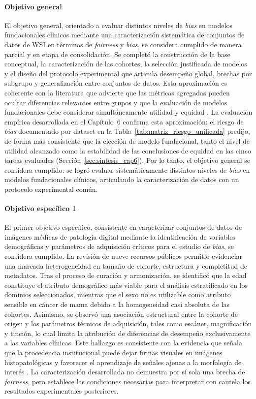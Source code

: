\paragraph{Objetivo general} El objetivo general, orientado a evaluar distintos niveles de \textit{bias} en modelos fundacionales clínicos mediante una caracterización sistemática de conjuntos de datos de WSI en términos de \textit{fairness} y \textit{bias}, se considera cumplido de manera parcial y en etapa de consolidación. Se completó la construcción de la base conceptual, la caracterización de las cohortes, la selección justificada de modelos y el diseño del protocolo experimental que articula desempeño global, brechas por subgrupo y generalización entre conjuntos de datos. Esta aproximación es coherente con la literatura que advierte que las métricas agregadas pueden ocultar diferencias relevantes entre grupos y que la evaluación de modelos fundacionales debe considerar simultáneamente utilidad y equidad \parencite{NEURIPS2024_c9826b9e}. La evaluación empírica desarrollada en el Capítulo~6 confirma esta aproximación: el riesgo de \textit{bias} documentado por dataset en la Tabla~\ref{tab:matriz_riesgo_unificada} predijo, de forma más consistente que la elección de modelo fundacional, tanto el nivel de utilidad alcanzado como la estabilidad de las conclusiones de equidad en las cinco tareas evaluadas (Sección~\ref{sec:sintesis_cap6}). Por lo tanto, el objetivo general se considera cumplido: se logró evaluar sistemáticamente distintos niveles de \textit{bias} en modelos fundacionales clínicos, articulando la caracterización de datos con un protocolo experimental común.

\paragraph{Objetivo específico 1} El primer objetivo específico, consistente en caracterizar conjuntos de datos de imágenes médicas de patología digital mediante la identificación de variables demográficas y parámetros de adquisición críticos para el estudio de \textit{bias}, se considera cumplido. La revisión de nueve recursos públicos permitió evidenciar una marcada heterogeneidad en tamaño de cohorte, estructura y completitud de metadatos. Tras el proceso de curación y armonización, se identificó que la edad constituye el atributo demográfico más viable para el análisis estratificado en los dominios seleccionados, mientras que el sexo no es utilizable como atributo sensible en cáncer de mama debido a la homogeneidad casi absoluta de las cohortes. Asimismo, se observó una asociación estructural entre la cohorte de origen y los parámetros técnicos de adquisición, tales como escáner, magnificación y tinción, lo cual limita la atribución de diferencias de desempeño exclusivamente a las variables clínicas. Este hallazgo es consistente con la evidencia que señala que la procedencia institucional puede dejar firmas visuales en imágenes histopatológicas y favorecer el aprendizaje de señales ajenas a la morfología de interés \parencite{alsaafin2023biased,howard2021site}. La caracterización desarrollada no demuestra por sí sola una brecha de \textit{fairness}, pero establece las condiciones necesarias para interpretar con cautela los resultados experimentales posteriores.

